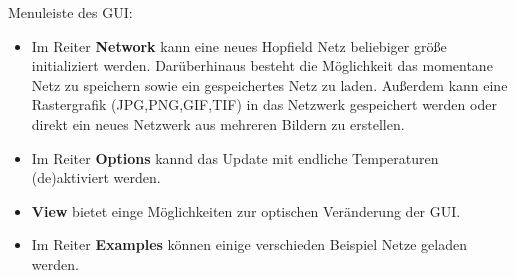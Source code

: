 Menuleiste des GUI:
\begin{itemize}
\item Im Reiter \textbf{Network} kann eine neues Hopfield Netz beliebiger größe initializiert werden. Darüberhinaus besteht die Möglichkeit das momentane Netz zu speichern sowie ein gespeichertes Netz zu laden. Außerdem kann eine Rastergrafik (JPG,PNG,GIF,TIF) in das Netzwerk gespeichert werden oder direkt ein neues Netzwerk aus mehreren Bildern zu erstellen.
\item Im Reiter \textbf{Options} kannd das Update mit endliche Temperaturen (de)aktiviert werden.
\item \textbf{View} bietet einge Möglichkeiten zur optischen Veränderung der GUI.
\item Im Reiter \textbf{Examples} können einige verschieden Beispiel Netze geladen werden.
\end{itemize}




\clearpage